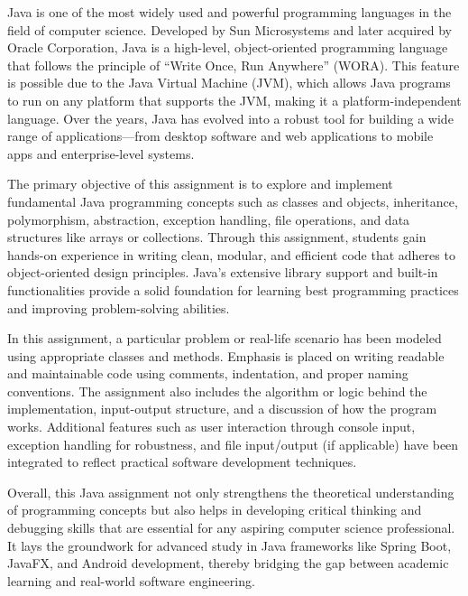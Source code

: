 {
Java is one of the most widely used and powerful programming languages in the field of computer science. Developed by Sun Microsystems and later acquired by Oracle Corporation, Java is a high-level, object-oriented programming language that follows the principle of “Write Once, Run Anywhere” (WORA). This feature is possible due to the Java Virtual Machine (JVM), which allows Java programs to run on any platform that supports the JVM, making it a platform-independent language. Over the years, Java has evolved into a robust tool for building a wide range of applications—from desktop software and web applications to mobile apps and enterprise-level systems.

The primary objective of this assignment is to explore and implement fundamental Java programming concepts such as classes and objects, inheritance, polymorphism, abstraction, exception handling, file operations, and data structures like arrays or collections. Through this assignment, students gain hands-on experience in writing clean, modular, and efficient code that adheres to object-oriented design principles. Java's extensive library support and built-in functionalities provide a solid foundation for learning best programming practices and improving problem-solving abilities.

In this assignment, a particular problem or real-life scenario has been modeled using appropriate classes and methods. Emphasis is placed on writing readable and maintainable code using comments, indentation, and proper naming conventions. The assignment also includes the algorithm or logic behind the implementation, input-output structure, and a discussion of how the program works. Additional features such as user interaction through console input, exception handling for robustness, and file input/output (if applicable) have been integrated to reflect practical software development techniques.

Overall, this Java assignment not only strengthens the theoretical understanding of programming concepts but also helps in developing critical thinking and debugging skills that are essential for any aspiring computer science professional. It lays the groundwork for advanced study in Java frameworks like Spring Boot, JavaFX, and Android development, thereby bridging the gap between academic learning and real-world software engineering.
}
